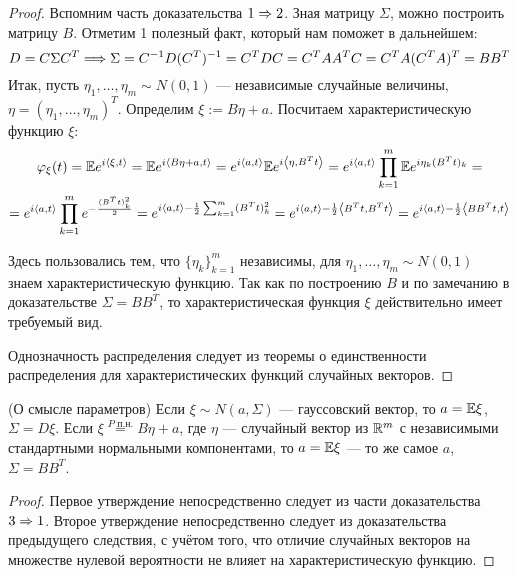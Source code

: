 \begin{proof}
    Вспомним часть доказательства $1 \Rightarrow 2$. Зная матрицу $\Sigma$, можно построить матрицу $B$. Отметим 1 полезный факт, который нам поможет в дальнейшем:
    \[
    	D = C \Sigma C^T \Longrightarrow \Sigma = C^{-1} D (C^T)^{-1} = C^T D C = C^T A A^T C = C^T A (C^T A)^T = B B^T
    \]
    Итак, пусть $\eta_1, \ldots, \eta_m \sim N(0, 1)$ --- независимые случайные величины, $\eta = (\eta_1, \ldots, \eta_m)^T$. Определим $\xi := B\eta + a$. Посчитаем характеристическую функцию $\xi$:
    \begin{multline*}
        \varphi_\xi(t) = \mathbb{E} e^{i \left\langle\xi, t\right\rangle} = \mathbb{E} e^{i \left\langle B\eta + a, t\right\rangle} = e^{i \left\langle a, t\right\rangle} \mathbb{E} e^{i \left\langle\eta, B^T t\right\rangle} = e^{i \left\langle a, t\right\rangle} \prod_{k = 1}^m \mathbb{E} e^{i \eta_k (B^T t)_k} =
        \\
        = e^{i \left\langle a, t\right\rangle} \prod_{k = 1}^m e^{-\frac{(B^T t)_k^2}{2}} = e^{i \left\langle a, t\right\rangle - \frac{1}{2} \sum_{k = 1}^m (B^T t)_k^2} = e^{i \left\langle a, t\right\rangle - \frac{1}{2} \left\langle B^T t, B^T t\right\rangle} = e^{i \left\langle a, t\right\rangle - \frac{1}{2} \left\langle B B^T t, t\right\rangle}
    \end{multline*}

    Здесь пользовались тем, что $\{\eta_k\}_{k = 1}^m$ независимы, для $\eta_1, \ldots, \eta_m \sim N(0, 1)$ знаем характеристическую функцию. Так как по построению $B$ и по замечанию в доказательстве $\Sigma = B B^T$, то характеристическая функция $\xi$ действительно имеет требуемый вид.

    Однозначность распределения следует из теоремы о единственности распределения для характеристических функций случайных векторов.
\end{proof}

\begin{corollary} (О смысле параметров)
    Если $\xi \sim N(a, \Sigma)$ --- гауссовский вектор, то $a = \mathbb{E}\xi$, $\Sigma = D\xi$. Если $\xi \stackrel{P\text{ п.н.}}{=} B\eta + a$, где $\eta$ --- случайный вектор из $\mathbb{R}^m$ с независимыми стандартными нормальными компонентами, то $a = \mathbb{E}\xi$ --- то же самое $a$, $\Sigma = B B^T$.
\end{corollary}

\begin{proof}
    Первое утверждение непосредственно следует из части доказательства $3 \Rightarrow 1$. Второе утверждение непосредственно следует из доказательства предыдущего следствия, с учётом того, что отличие случайных векторов на множестве нулевой вероятности не влияет на характеристическую функцию.
\end{proof}


